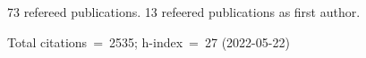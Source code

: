 73 refereed publications. 13 refeered publications as first author.

Total citations~=~2535; h-index~=~27 (2022-05-22)